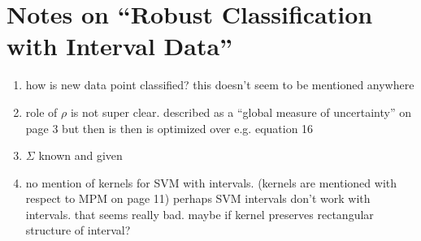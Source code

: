 \documentclass[11pt]{article}
\begin{document}
\section{Notes on ``Robust Classification with Interval Data''}
\begin{enumerate}
\item how is new data point classified? this doesn't seem to be mentioned anywhere
\item role of $\rho$ is not super clear. described as a ``global measure of uncertainty'' on page 3 but then is then is optimized over e.g. equation 16
\item $\Sigma$ known and given
\item no mention of kernels for SVM with intervals. (kernels are mentioned with respect to MPM on page 11) perhaps SVM intervals don't work with intervals. that seems really bad. maybe if kernel preserves rectangular structure of interval?
\end{enumerate}



\end{document}
